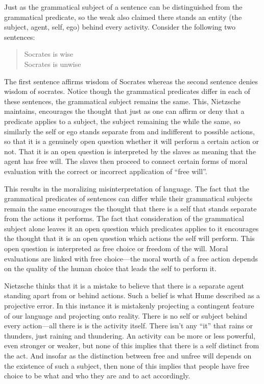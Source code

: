 Just as the grammatical subject of a sentence can be distinguished from the grammatical predicate, so the weak also claimed there stands an entity (the subject, agent, self, ego) behind every activity. Consider the following two sentences:
\begin{quote}
    Socrates is wise\\
    Socrates is unwise
\end{quote}
The first sentence affirms wisdom of Socrates whereas the second sentence denies wisdom of socrates. Notice though the grammatical predicates differ in each of these sentences, the grammatical subject remains the same. This, Nietzsche maintains, encourages the thought that just as one can affirm or deny that a predicate applies to a subject, the subject remaining the while the same, so similarly the self or ego stands separate from and indifferent to possible actions, so that it is a genuinely open question whether it will perform a certain action or not. That it is an open question is interpreted by the slaves as meaning that the agent has free will. The slaves then proceed to connect certain forms of moral evaluation with the correct or incorrect application of ``free will''. 

This results in the moralizing misinterpretation of language. The fact that the grammatical predicates of sentences can differ while their grammatical subjects remain the same encourages the thought that there is a self that stands separate from the actions it performs. The fact that consideration of the grammatical subject alone leaves it an open question which predicates applies to it encourages the thought that it is an open question which actions the self will perform. This open question is interpreted as free choice or freedom of the will. Moral evaluations are linked with free choice---the moral worth of a free action depends on the quality of the human choice that leads the self to perform it.

Nietzsche thinks that it is a mistake to believe that there is a separate agent standing apart from or behind actions. Such a belief is what Hume described as a projective error. In this instance it is mistakenly projecting a contingent feature of our language and projecting onto reality. There is no self or subject behind every action---all there is is the activity itself. There isn't any ``it'' that rains or thunders, just raining and thundering. An activity can be more or less powerful, even stronger or weaker, but none of this implies that there is a self distinct from the act. And insofar as the distinction between free and unfree will depends on the existence of such a subject, then none of this implies that people have free choice to be what and who they are and to act accordingly. \change

